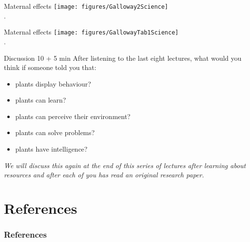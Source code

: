 \documentclass[10pt]{beamer}
\newcommand\webglyphs[1]{{\webglyphsfont\symbol{#1}}}
\newcommand\Discussion{\colorbox{white}{\textcolor{black}{\webglyphs{"F134}}}\xspace}
\begin{document}
\begin{frame}{Maternal effects}
    \centering
    \texttt{[image: figures/Galloway2Science]}\\
    {\small \autocite[from][]{Galloway2007}.}
\end{frame}

\begin{frame}{Maternal effects}
    \centering
    \texttt{[image: figures/GallowayTab1Science]}\\
    {\small \autocite[from][]{Galloway2007}.}
\end{frame}

\begin{frame}{Discussion \Discussion 10 + 5 min}
  After listening to the last eight lectures, what would you think if someone told you that:
  \begin{itemize}
    \item plants display behaviour?
    \item plants can learn?
    \item plants can perceive their environment?
    \item plants can solve problems?
    \item plants have intelligence?
  \end{itemize}
  \emph{We will discuss this again at the end of this series of lectures after learning about resources and after each of you has read an original research paper.}
\end{frame}


  \section*{References}
  \begin{frame}[t,allowframebreaks]
    \frametitle{References}
    \printbibliography
  \end{frame}
\end{document}
